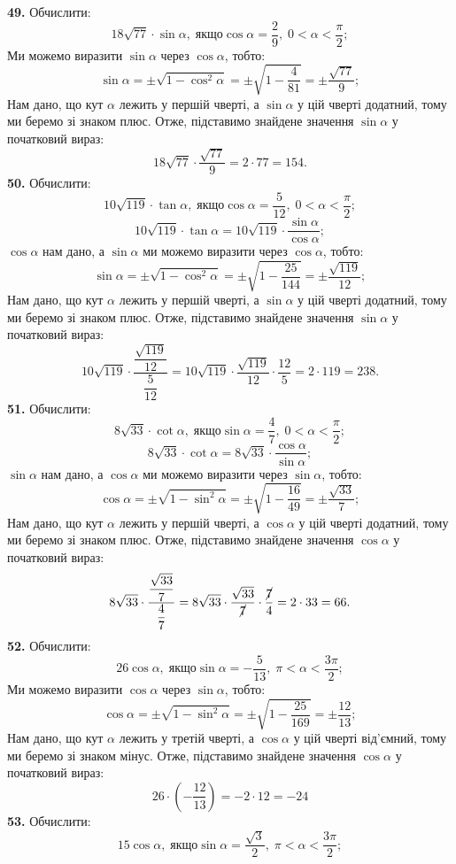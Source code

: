 \textbf{49.} Обчислити:
$$
18\sqrt{77}\cdot\sin\alpha, \; \mbox{якщо} \cos\alpha=\dfrac{2}{9}, \; 0<\alpha<\dfrac{\pi}{2};
$$
Ми можемо виразити $\sin\alpha$ через $\cos\alpha$, тобто:
$$
\sin\alpha=\pm\sqrt{1-\cos^{2}\alpha}=\pm\sqrt{1-\dfrac{4}{81}}=\pm\dfrac{\sqrt{77}}{9};
$$
Нам дано, що кут $\alpha$ лежить у першій чверті, а $\sin\alpha$ у цій чверті додатний, тому ми беремо зі знаком плюс. Отже, підставимо знайдене значення $\sin\alpha$ у початковий вираз:
$$
18\sqrt{77}\cdot\dfrac{\sqrt{77}}{9}=2\cdot77=154.
$$
\textbf{50.} Обчислити:
$$
10\sqrt{119}\cdot\tan\alpha, \; \mbox{якщо} \cos\alpha=\dfrac{5}{12}, \; 0<\alpha<\dfrac{\pi}{2};
$$
$$
10\sqrt{119}\cdot\tan\alpha=10\sqrt{119}\cdot\dfrac{\sin\alpha}{\cos\alpha};
$$
$\cos\alpha$ нам дано, а $\sin\alpha$ ми можемо виразити через $\cos\alpha$, тобто:
$$
\sin\alpha=\pm\sqrt{1-\cos^{2}\alpha}=\pm\sqrt{1-\dfrac{25}{144}}=\pm\dfrac{\sqrt{119}}{12};
$$
Нам дано, що кут $\alpha$ лежить у першій чверті, а $\sin\alpha$ у цій чверті додатний, тому ми беремо зі знаком плюс. Отже, підставимо знайдене значення $\sin\alpha$ у початковий вираз:
$$
10\sqrt{119}\cdot\dfrac{\dfrac{\sqrt{119}}{12}}{\dfrac{5}{12}}=10\sqrt{119}\cdot\dfrac{\sqrt{119}}{12}\cdot\dfrac{12}{5}=2\cdot119=238.
$$
\textbf{51.} Обчислити:
$$
8\sqrt{33}\cdot\cot\alpha, \; \mbox{якщо} \sin\alpha=\dfrac{4}{7}, \; 0<\alpha<\dfrac{\pi}{2};
$$
$$
8\sqrt{33}\cdot\cot\alpha=8\sqrt{33}\cdot\dfrac{\cos\alpha}{\sin\alpha};
$$
$\sin\alpha$ нам дано, а $\cos\alpha$ ми можемо виразити через $\sin\alpha$, тобто:
$$
\cos\alpha=\pm\sqrt{1-\sin^{2}\alpha}=\pm\sqrt{1-\dfrac{16}{49}}=\pm\dfrac{\sqrt{33}}{7};
$$
Нам дано, що кут $\alpha$ лежить у першій чверті, а $\cos\alpha$ у цій чверті додатний, тому ми беремо зі знаком плюс. Отже, підставимо знайдене значення $\cos\alpha$ у початковий вираз:
$$
8\sqrt{33}\cdot\dfrac{\dfrac{\sqrt{33}}{7}}{\dfrac{4}{7}}=
8\sqrt{33}\cdot\dfrac{\sqrt{33}}{\cancel{7}}\cdot\dfrac{\cancel{7}}{4}=
2\cdot33=66.
$$
\textbf{52.} Обчислити:
$$
26\cos\alpha, \; \mbox{якщо} \sin\alpha=-\dfrac{5}{13}, \; \pi<\alpha<\dfrac{3\pi}{2};
$$
Ми можемо виразити $\cos\alpha$ через $\sin\alpha$, тобто:
$$
\cos\alpha=\pm\sqrt{1-\sin^{2}\alpha}=\pm\sqrt{1-\dfrac{25}{169}}=\pm\dfrac{12}{13};
$$
Нам дано, що кут $\alpha$ лежить у третій чверті, а $\cos\alpha$ у цій чверті від'ємний, тому ми беремо зі знаком мінус. Отже, підставимо знайдене значення $\cos\alpha$ у початковий вираз:
$$
26\cdot\left(-\dfrac{12}{13}\right)=-2\cdot12=-24
$$
\textbf{53.} Обчислити:
$$
15\cos\alpha, \; \mbox{якщо} \sin\alpha=\dfrac{\sqrt{3}}{2}, \; \pi<\alpha<\dfrac{3\pi}{2};
$$
